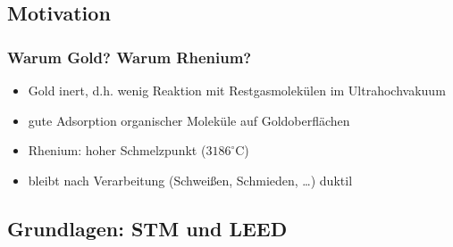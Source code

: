 \documentclass{beamer}
\begin{document}
\subsection[Motivation]{Motivation}

\begin{frame}
\frametitle{Warum Gold? Warum Rhenium?}
\begin{itemize}\setlength{\itemsep}{+15pt}
 	\item Gold inert, d.h. wenig Reaktion mit Restgasmolekülen im Ultrahochvakuum
 	\item gute Adsorption organischer Moleküle auf Goldoberflächen
 \end{itemize}
 \vspace{1cm}
 \begin{itemize}\setlength{\itemsep}{+15pt}
  	\item Rhenium: hoher Schmelzpunkt ($3186^\circ$C)
  	\item bleibt nach Verarbeitung (Schweißen, Schmieden, \ldots) duktil
 \end{itemize}
\end{frame}



\subsection[Grundlagen]{Grundlagen: STM und LEED}
\end{document}
